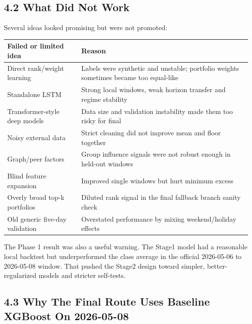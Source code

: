 \documentclass[11pt]{article}
\begin{document}
\subsection{4.2 What Did Not Work}\label{what-did-not-work}

Several ideas looked promising but were not promoted:

\begin{longtable}[]{@{}|
  >{\RaggedRight\arraybackslash}m{}|
  >{\RaggedRight\arraybackslash}m{}|@{}}
\hline\rowcolor{tableHead}
\begin{minipage}[c]{\linewidth}\centering\bfseries
Failed or limited idea
\end{minipage} & \begin{minipage}[c]{\linewidth}\centering\bfseries
Reason
\end{minipage} \\
\hline
\endhead
\hline
\endlastfoot
Direct rank/weight learning & Labels were synthetic and unstable;
portfolio weights sometimes became too equal-like \\
\hline
Standalone LSTM & Strong local windows, weak horizon transfer and regime
stability \\
\hline
Transformer-style deep models & Data size and validation instability
made them too risky for final \\
\hline
Noisy external data & Strict cleaning did not improve mean and floor
together \\
\hline
Graph/peer factors & Group influence signals were not robust enough in
held-out windows \\
\hline
Blind feature expansion & Improved single windows but hurt minimum
excess \\
\hline
Overly broad top-k portfolios & Diluted rank signal in the final
fallback branch sanity check \\
\hline
Old generic five-day validation & Overstated performance by mixing
weekend/holiday effects \\
\end{longtable}

The Phase 1 result was also a useful warning. The Stage1 model had a
reasonable local backtest but underperformed the class average in the
official 2026-05-06 to 2026-05-08 window. That pushed the Stage2 design
toward simpler, better-regularized models and stricter self-tests.

\subsection{4.3 Why The Final Route Uses Baseline XGBoost On
2026-05-08}\label{why-the-final-route-uses-baseline-xgboost-on-2026-05-08}
\end{document}

